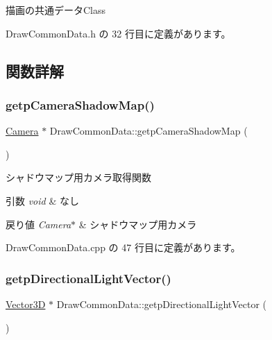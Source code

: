 描画の共通データ\+Class 

 Draw\+Common\+Data.\+h の 32 行目に定義があります。



\subsection{関数詳解}
\mbox{\label{class_draw_common_data_a08fceba2155d3a45a3004b0aba97ea2a}} 
\subsubsection{\texorpdfstring{getp\+Camera\+Shadow\+Map()}{getpCameraShadowMap()}}
{\footnotesize\ttfamily \mbox{\hyperlink{class_camera}{Camera}} $\ast$ Draw\+Common\+Data\+::getp\+Camera\+Shadow\+Map (\begin{DoxyParamCaption}{ }\end{DoxyParamCaption})}



シャドウマップ用カメラ取得関数 


\begin{DoxyParams}{引数}
{\em void} & なし \\
\hline
\end{DoxyParams}

\begin{DoxyRetVals}{戻り値}
{\em Camera$\ast$} & シャドウマップ用カメラ \\
\hline
\end{DoxyRetVals}


 Draw\+Common\+Data.\+cpp の 47 行目に定義があります。

\mbox{\label{class_draw_common_data_a114bdbc03af787ffb0860e1ae9ec6ef9}} 
\subsubsection{\texorpdfstring{getp\+Directional\+Light\+Vector()}{getpDirectionalLightVector()}}
{\footnotesize\ttfamily \mbox{\hyperlink{class_vector3_d}{Vector3D}} $\ast$ Draw\+Common\+Data\+::getp\+Directional\+Light\+Vector (\begin{DoxyParamCaption}{ }\end{DoxyParamCaption})}



